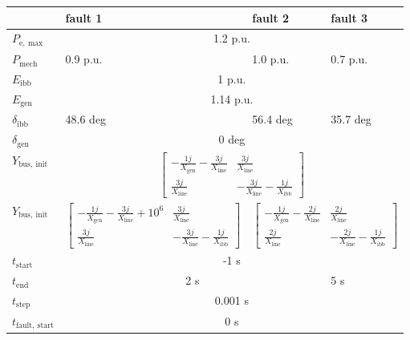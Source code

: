 \begin{centering}
    \small
    \begin{tabularx}{\textwidth}{l|X|l|l}
        & fault 1 & fault 2 & fault 3 \\ \hline \hline
        $P_\mathrm{e,~max}$     & \multicolumn{3}{c}{1.2 p.u.} \\ \hline
        $P_\mathrm{mech}$       & 0.9 p.u. & 1.0 p.u. & 0.7 p.u. \\ \hline
        $E_\mathrm{ibb}$        & \multicolumn{3}{c}{1 p.u.} \\ \hline
        $E_\mathrm{gen}$        & \multicolumn{3}{c}{1.14 p.u.} \\ \hline
        $\delta_\mathrm{ibb}$   & 48.6 deg & 56.4 deg & 35.7 deg \\ \hline
        $\delta_\mathrm{gen}$   & \multicolumn{3}{c}{0 deg} \\ \hline

        $Y_\mathrm{bus,~init}$ & \multicolumn{3}{c}{$\begin{bmatrix} -\frac{1j}{X_\mathrm{gen}}-\frac{3j}{X_\mathrm{line}} & \frac{3j}{X_\mathrm{line}} \\ \frac{3j}{X_\mathrm{line}} & -\frac{3j}{X_\mathrm{line}}-\frac{1j}{X_\mathrm{ibb}}\end{bmatrix}$} \\ \hline

        $Y_\mathrm{bus,~init}$ & $\begin{bmatrix} -\frac{1j}{X_\mathrm{gen}}-\frac{3j}{X_\mathrm{line}} + 10^6 & \frac{3j}{X_\mathrm{line}} \\ \frac{3j}{X_\mathrm{line}} & -\frac{3j}{X_\mathrm{line}}-\frac{1j}{X_\mathrm{ibb}}\end{bmatrix}$ 
        & \multicolumn{2}{c}{$\begin{bmatrix} -\frac{1j}{X_\mathrm{gen}}-\frac{2j}{X_\mathrm{line}} & \frac{2j}{X_\mathrm{line}} \\ \frac{2j}{X_\mathrm{line}} & -\frac{2j}{X_\mathrm{line}}-\frac{1j}{X_\mathrm{ibb}}\end{bmatrix}$} \\ \hline \hline

        $t_\mathrm{start}$      & \multicolumn{3}{c}{-1 s} \\ \hline
        $t_\mathrm{end}$        & \multicolumn{2}{c|}{2 s} & 5 s \\ \hline
        $t_\mathrm{step}$       & \multicolumn{3}{c}{0.001 s} \\ \hline
        $t_\mathrm{fault,~start}$   & \multicolumn{3}{c}{0 s} \\
    \end{tabularx}
\end{centering}

